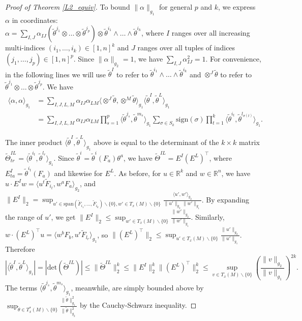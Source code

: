 \documentclass[11pt]{article}
\newcommand{\iprod}[1]{\langle #1 \rangle}
\begin{document}
\begin{proof}[Proof of Theorem \ref{L2_equiv}]
To bound $\|\alpha\|_{g_1}$ for general $p$ and $k$, we express $\alpha$ in coordinates: \\$\alpha = \sum_{I,J} \alpha_{IJ} (\tilde\theta^{j_1} \otimes \dots \otimes \tilde\theta^{j_p}) \otimes \tilde\theta^{i_1}\wedge\dots\wedge\tilde\theta^{i_k}$, where $I$ ranges over all increasing multi-indices $(i_1,\dots,i_k) \in [1,n]^k$ and $J$ ranges over all tuples of indices $(j_1,\dots,j_p) \in [1,n]^p$. Since $\|\alpha\|_{g_2} = 1$, we have $\sum_{I,J} \alpha_{IJ}^2 = 1$. For convenience, in the following lines we will use $\tilde\theta^I$ to refer to $\tilde\theta^{i_1}\wedge \dots \wedge\tilde\theta^{i_k}$ and $\otimes^J\tilde\theta$ to refer to $\tilde\theta^{j_1}\otimes \dots \otimes \tilde\theta^{j_p}$.  We have
\begin{align*}
\iprod{\alpha,\alpha}_{g_1} &= \sum_{I,J,L,M} \alpha_{IJ}\alpha_{LM} \iprod{\otimes^J\tilde\theta,\otimes^M\tilde\theta}_{g_1}\iprod{\tilde\theta^I,\tilde\theta^L}_{g_1}\\
&= \sum_{I,J,L,M} \alpha_{IJ}\alpha_{LM}\prod_{s = 1}^p \iprod{\tilde\theta^{j_s},\tilde\theta^{m_s}}_{g_1}\sum_{\sigma \in S_{k}}\mathrm{sign}(\sigma)\prod_{t = 1}^{k} \iprod{ \tilde\theta^{i_t}, \tilde\theta^{l_{\sigma(t)}} }_{g_1}.
\end{align*}

The inner product $\iprod{\tilde\theta^I,\tilde \theta^L}_{g_1}$ above is equal to the determinant of the $k\times k$ matrix $\tilde\Theta^{IL}_{tr} = \iprod{\tilde\theta^{i_t},\tilde\theta^{l_r}}_{g_1}$. Since $\tilde \theta^i = \tilde\theta^i(F_a)\theta^a$, we have $\tilde\Theta^{IL} = E^I(E^L)^\intercal$, where $E^I_{ta} = \tilde\theta^{i_t}(F_a)$ and likewise for $E^L$. As before, for $u \in \mathbb{R}^k$ and $w \in \mathbb{R}^n$, we have $u \cdot E^I w = \iprod{u^t \tilde F_{i_t},w^a F_a}_{g_2}$, and $\|E^I\|_2 = \sup_{u' \in \mathrm{span}(\tilde{F}_{i_1},\dots,\tilde{F}_{i_k}) \backslash \{0\}, w' \in T_x(M)\backslash \{0\}} \frac{\iprod{u',w'}_{g_2}}{\|u'\|_{g_2}\|w'\|_{g_1}}$. By expanding the range of $u'$, we get $\|E^I\|_2 \le \sup_{w' \in T_x(M) \backslash \{0\}} \frac{\|w'\|_{g_2}}{\|w'\|_{g_1}}$. Similarly, $w \cdot (E^L)^\intercal u = \iprod{w^b F_b,u^r\tilde F_{l_r}}_{g_1}$, so $\|(E^L)^\intercal\|_2 \le \sup_{u' \in T_x(M) \backslash \{0\}} \frac{\|u'\|_{g_2}}{\|u'\|_{g_1}}$. Therefore 
\[
|\iprod{\tilde \theta^I,\tilde \theta^L}_{g_1}| = |\mathrm{det}(\tilde\Theta^{IL})| \le \|\tilde \Theta^{IL}\|_2^k \le \|E^I\|_2^k\|(E^L)^\intercal\|_2^k \le \sup_{v \in T_x(M) \backslash \{0\}} \left(\frac{\|v\|_{g_2}}{\|v\|_{g_1}}\right)^{2k}.
\]
The terms $\iprod{\tilde \theta^{j_s},\tilde\theta^{m_s}}_{g_1}$, meanwhile, are simply bounded above by $\sup_{\tilde \theta \in T_x^*(M) \backslash \{0\}} \frac{\|\tilde \theta\|_{g_1}^2}{\|\tilde \theta\|_{g_2}^2}$ by the Cauchy-Schwarz inequality.


\end{proof}
\end{document}
